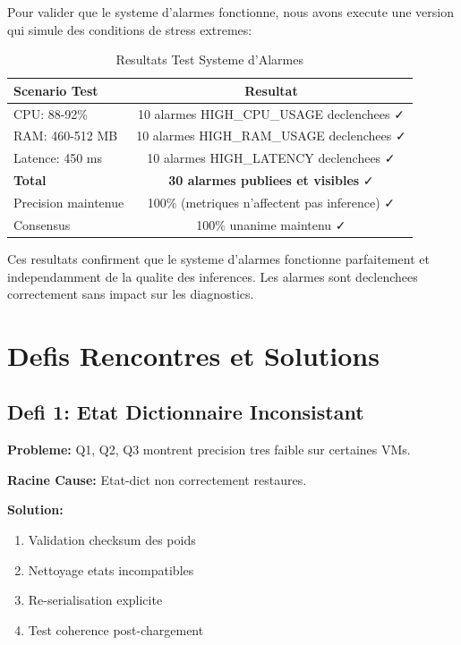 \documentclass[12pt,a4paper]{report}
\begin{document}
Pour valider que le systeme d'alarmes fonctionne, nous avons execute une version qui simule des conditions de stress extremes:

\begin{table}[H]
\centering
\begin{tabular}{|l|c|}
\hline
\textbf{Scenario Test} & \textbf{Resultat} \\
\hline
CPU: 88-92\% & 10 alarmes HIGH\_CPU\_USAGE declenchees ✓ \\
RAM: 460-512 MB & 10 alarmes HIGH\_RAM\_USAGE declenchees ✓ \\
Latence: 450 ms & 10 alarmes HIGH\_LATENCY declenchees ✓ \\
\hline
\textbf{Total} & \textbf{30 alarmes publiees et visibles} ✓ \\
Precision maintenue & 100\% (metriques n'affectent pas inference) ✓ \\
Consensus & 100\% unanime maintenu ✓ \\
\hline
\end{tabular}
\caption{Resultats Test Systeme d'Alarmes}
\end{table}

Ces resultats confirment que le systeme d'alarmes fonctionne parfaitement et independamment de la qualite des inferences. Les alarmes sont declenchees correctement sans impact sur les diagnostics.

\chapter{Defis Rencontres et Solutions}

\section{Defi 1: Etat Dictionnaire Inconsistant}

\textbf{Probleme:} Q1, Q2, Q3 montrent precision tres faible sur certaines VMs.

\textbf{Racine Cause:} Etat-dict non correctement restaures.

\textbf{Solution:}
\begin{enumerate}
    \item Validation checksum des poids
    \item Nettoyage etats incompatibles
    \item Re-serialisation explicite
    \item Test coherence post-chargement
\end{enumerate}
\end{document}

